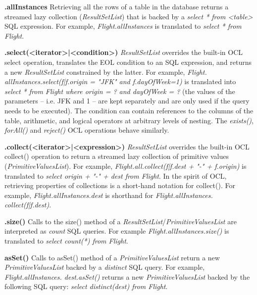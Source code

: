 \begin{description}

\item\textbf{.allInstances} Retrieving all the rows of a table in the database returns a streamed lazy collection (\emph{ResultSetList}) that is backed by a \emph{select * from <table>} SQL expression. For example, \emph{Flight.allInstances} is translated to \emph{select * from Flight}.

\item\textbf{.select(<iterator>|<condition>)} \emph{ResultSetList} overrides the built-in OCL select operation, translates the EOL condition to an SQL expression, and returns a new \emph{ResultSetList} constrained by the latter. For example, \emph{Flight. allInstances.select(f|f.origin = "JFK" and f.dayOfWeek=1)} is translated into \emph{select * from Flight where origin = ? and dayOfWeek = ?} (the values of the parameters -- i.e. JFK and 1 -- are kept separately and are only used if the query needs to be executed). The condition can contain references to the columns of the table, arithmetic, and logical operators at arbitrary levels of nesting. The \emph{exists()}, \emph{forAll()} and \emph{reject()} OCL operations behave similarly.

\item\textbf{.collect(<iterator>|<expression>)} \emph{ResultSetList} overrides the built-in OCL collect() operation to return a streamed lazy collection of primitive values (\emph{PrimitiveValuesList}). For example, \emph{Flight.all.collect(f|f.dest + "-" + f.origin)} is translated to \emph{select origin + "-" + dest from Flight}. In the spirit of OCL, retrieving properties of collections is a short-hand notation for collect(). For example, \emph{Flight.allInstances.dest} is shorthand for \emph{Flight.allInstances. collect(f|f.dest)}.

\item\textbf{.size()} Calls to the size() method of a \emph{ResultSetList}/\emph{PrimitiveValuesList} are interpreted as \emph{count} SQL queries. For example \emph{Flight.allInstances.size()} is translated to \emph{select count(*) from Flight}.

\item\textbf{asSet()} Calls to asSet() method of a \emph{PrimitiveValuesList} return a new \emph{PrimitiveValuesList} backed by a \emph{distinct} SQL query. For example, \emph{Flight.allInstances. dest.asSet()} returns a new \emph{PrimitiveValuesList} backed by the following SQL query: \emph{select distinct(dest) from Flight}. 

\end{description}

